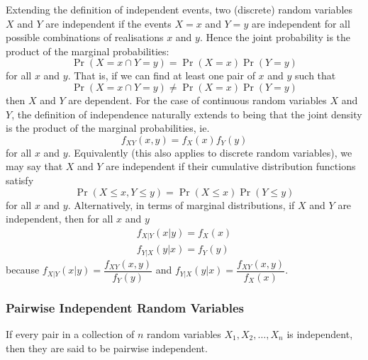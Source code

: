 \documentclass[11pt]{report} %
\begin{document}
Extending the definition of independent events, two (discrete) random variables $X$ and $Y$ are independent if the events $X = x$ and $Y = y$ are independent for all possible combinations of realisations $x$ and $y$. Hence the joint probability is the product of the marginal probabilities:
\begin{equation}
\operatorname{Pr}\left(X = x \cap Y = y\right) = \operatorname{Pr}\left(X = x\right)\operatorname{Pr}\left(Y = y\right)
\end{equation}
for all $x$ and $y$. That is, if we can find at least one pair of $x$ and $y$ such that
\begin{equation}
\operatorname{Pr}\left(X = x \cap Y = y\right) \neq \operatorname{Pr}\left(X = x\right)\operatorname{Pr}\left(Y = y\right)
\end{equation}
then $X$ and $Y$ are dependent. For the case of continuous random variables $X$ and $Y$, the definition of independence naturally extends to being that the joint density is the product of the marginal probabilities, ie.
\begin{equation}
f_{XY}\left(x, y\right) = f_{X}\left(x\right)f_{Y}\left(y\right)
\end{equation}
for all $x$ and $y$. Equivalently (this also applies to discrete random variables), we may say that $X$ and $Y$ are independent if their cumulative distribution functions satisfy
\begin{equation}
\operatorname{Pr}\left(X \leq x, Y \leq y\right) = \operatorname{Pr}\left(X \leq x\right)\operatorname{Pr}\left(Y \leq y\right)
\end{equation}
for all $x$ and $y$. Alternatively, in terms of marginal distributions, if $X$ and $Y$ are independent, then for all $x$ and $y$
\begin{gather}
f_{X|Y}\left(x|y\right) = f_{X}\left(x\right) \\
f_{Y|X}\left(y|x\right) = f_{Y}\left(y\right)
\end{gather}
because $f_{X|Y}\left(x|y\right) = \dfrac{f_{XY}\left(x, y\right)}{f_{Y}\left(y\right)}$ and $f_{Y|X}\left(y|x\right) = \dfrac{f_{XY}\left(x, y\right)}{f_{X}\left(x\right)}$.

\subsubsection{Pairwise Independent Random Variables}

If every pair in a collection of $n$ random variables $X_{1}, X_{2}, \dots, X_{n}$ is independent, then they are said to be pairwise independent.
\end{document}
